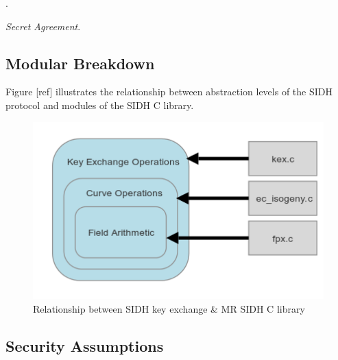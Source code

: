 \noindent
{}.

\noindent
\textit{Secret Agreement}.

\begin{center}
\end{center}

\subsection{Modular Breakdown}

Figure [ref] illustrates the relationship between abstraction levels of the SIDH protocol and modules of the SIDH C library.

\begin{figure}[htb]
\centering
\includegraphics[scale=0.7]{halfmapwcurve.png} %
\caption{Relationship between SIDH key exchange \& MR SIDH C library}
\label{fig:halfmap} %
\end{figure}


\subsection{Security Assumptions}




